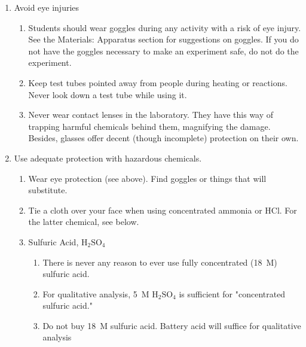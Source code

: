 \begin{enumerate}
\begin{enumerate}
{The only thing more dangerous than cutting with a sharp knife 
is cutting with a dull one.}
\item{Use the right tool for cutting.}
\item{Use as little glass as possible.}
\item{Do not use broken glass apparatus. 
The last thing you want to deal with during a practical is serious bleeding. 
It is tempting to keep using that flask with the jagged top. 
Do not. 
Do not let anyone else use it either -- break it the rest of the way.}
\item{Dispose of sharp trash (glass shards, syringe needles) 
in a safe place, like a deep pit latrine.}
\end{enumerate}
\item{Avoid eye injuries}
\begin{enumerate}
\item{Students should wear goggles during any activity 
with a risk of eye injury. 
See the Materials: Apparatus section for suggestions on goggles. 
If you do not have the goggles necessary to make an experiment safe, 
do not do the experiment.}
\item{Keep test tubes pointed away from people during heating or reactions. 
Never look down a test tube while using it.}
\item{Never wear contact lenses in the laboratory. 
They have this way of trapping harmful chemicals behind them, 
magnifying the damage. 
Besides, glasses offer decent (though incomplete) protection on their own.}
\end{enumerate}
\item{Use adequate protection with hazardous chemicals.}
\begin{enumerate}
\item{Wear eye protection (see above). 
Find goggles or things that will substitute.}
\item{Tie a cloth over your face when using concentrated ammonia or HCl. 
For the latter chemical, see below.}
\item{Sulfuric Acid, $\mbox{H}_{2}\mbox{SO}_{4}$}
\begin{enumerate}
\item{There is never any reason to ever use 
fully concentrated (18~M) sulfuric acid.}
\item{For qualitative analysis, 5~M $\mbox{H}_{2}\mbox{SO}_{4}$ 
is sufficient for "concentrated sulfuric acid."}
\item{Do not buy 18~M sulfuric acid. 
Battery acid will suffice for qualitative analysis 
}
\end{enumerate}
\end{enumerate}
\end{enumerate}
